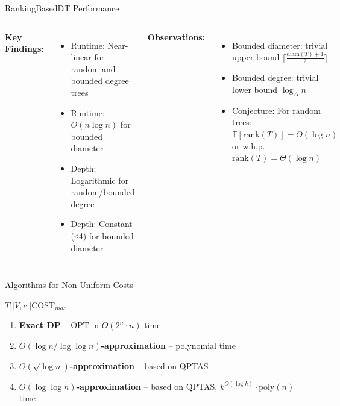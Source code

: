 \documentclass[aspectratio=169]{beamer}
\newcommand{\OPT}{\text{OPT}}
\newcommand{\COST}{\text{COST}}
\begin{document}
\begin{frame}{RankingBasedDT Performance}
\begin{columns}[T]
\textbf{Key Findings:}
\begin{itemize}
    \item Runtime: Near-linear for random and bounded degree trees
    \item Runtime: $O(n \log n)$ for bounded diameter
    \item Depth: Logarithmic for random/bounded degree
    \item Depth: Constant (≤4) for bounded diameter
\end{itemize}

\pause

\textbf{Observations:}
\begin{itemize}
    \item Bounded diameter: trivial upper bound $\lceil \frac{\text{diam}(T)+1}{2} \rceil$
    \item Bounded degree: trivial lower bound $\log_{\Delta}n$
    \item Conjecture: For random trees: $\mathbb{E}[\text{rank}(T)] = \Theta(\log n)$ or w.h.p. $\text{rank}(T) = \Theta(\log n)$
\end{itemize}
\end{columns}
\end{frame}

\begin{frame}{Algorithms for Non-Uniform Costs}
\begin{block}{$T||V, c||\COST_{max}$}
\begin{enumerate}
    \item \textbf{Exact DP} -- $\OPT$ in $O(2^n \cdot n)$ time
    \pause
    \item \textbf{$O(\log n / \log \log n)$-approximation} -- polynomial time
    \pause
    \item \textbf{$O(\sqrt{\log n})$-approximation} -- based on QPTAS
    \pause
    \item \textbf{$O(\log \log n)$-approximation} -- based on QPTAS, $k^{O(\log k)} \cdot \text{poly}(n)$ time
\end{enumerate}
\end{block}
\end{frame}
\end{document}

